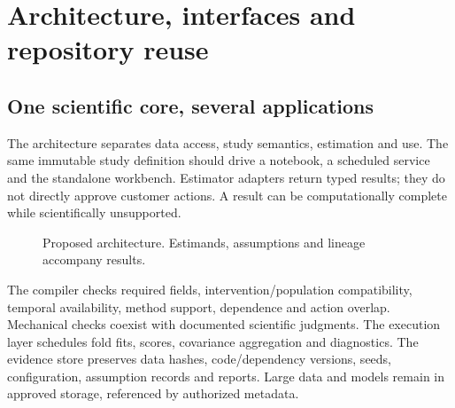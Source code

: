 \chapter{Architecture, interfaces and repository reuse}\label{ch:architecture}
\section{One scientific core, several applications}
The architecture separates data access, study semantics, estimation and use.
The same immutable study definition should drive a notebook, a scheduled
service and the standalone workbench. Estimator adapters return typed
results; they do not directly approve customer actions. A result can be
computationally complete while scientifically unsupported.

\begin{figure}[htbp]\centering
{}
\caption{Proposed architecture. Estimands, assumptions and lineage accompany results.}
\label{fig:architecture}
\end{figure}

The compiler checks required fields, intervention/population compatibility,
temporal availability, method support, dependence and action overlap.
Mechanical checks coexist with documented scientific judgments.
The execution layer schedules fold fits, scores, covariance aggregation
and diagnostics. The evidence store preserves data hashes, code/dependency
versions, seeds, configuration, assumption records and reports.
Large data and models remain in approved storage, referenced by authorized
metadata.

